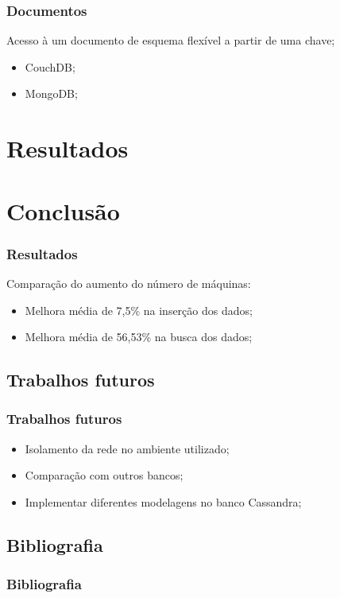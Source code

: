 \documentclass[brazil]{beamer}
\begin{document}
\begin{frame}
	\frametitle{Documentos}
		Acesso à um documento de esquema flexível a partir de uma chave;
		\begin{itemize}
			\item CouchDB;
			\item MongoDB;
		\end{itemize}
	
\end{frame}

\section{Resultados}


\section{Conclusão}
\begin{frame}
\frametitle{Resultados}
	Comparação do aumento do número de máquinas:
\begin{itemize}
	\item Melhora média de 7,5\% na inserção dos dados;
	\item Melhora média de 56,53\% na busca dos dados;
\end{itemize}
\end{frame}

\subsection{Trabalhos futuros}
\begin{frame}
\frametitle{Trabalhos futuros}
\begin{itemize}
	\item Isolamento da rede no ambiente utilizado;
	\item Comparação com outros bancos;
	\item Implementar diferentes modelagens no banco Cassandra;
\end{itemize}


\end{frame}

\subsection{Bibliografia}
\begin{frame}
\frametitle{Bibliografia}\footnotesize
  \nocite{}
  
  
\end{frame}


\end{document}
